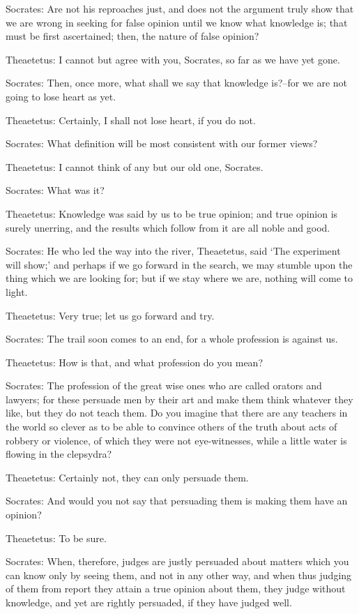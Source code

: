 Socrates: Are not his reproaches just, and does not the argument truly
show that we are wrong in seeking for false opinion until we know what
knowledge is; that must be first ascertained; then, the nature of false
opinion?

Theaetetus: I cannot but agree with you, Socrates, so far as we have yet
gone.

Socrates: Then, once more, what shall we say that knowledge is?--for we
are not going to lose heart as yet.

Theaetetus: Certainly, I shall not lose heart, if you do not.

Socrates: What definition will be most consistent with our former views?

Theaetetus: I cannot think of any but our old one, Socrates.

Socrates: What was it?

Theaetetus: Knowledge was said by us to be true opinion; and true
opinion is surely unerring, and the results which follow from it are all
noble and good.

Socrates: He who led the way into the river, Theaetetus, said `The
experiment will show;' and perhaps if we go forward in the search, we
may stumble upon the thing which we are looking for; but if we stay
where we are, nothing will come to light.

Theaetetus: Very true; let us go forward and try.

Socrates: The trail soon comes to an end, for a whole profession is
against us.

Theaetetus: How is that, and what profession do you mean?

Socrates: The profession of the great wise ones who are called orators
and lawyers; for these persuade men by their art and make them think
whatever they like, but they do not teach them. Do you imagine that
there are any teachers in the world so clever as to be able to convince
others of the truth about acts of robbery or violence, of which
they were not eye-witnesses, while a little water is flowing in the
clepsydra?

Theaetetus: Certainly not, they can only persuade them.

Socrates: And would you not say that persuading them is making them have
an opinion?

Theaetetus: To be sure.

Socrates: When, therefore, judges are justly persuaded about matters
which you can know only by seeing them, and not in any other way, and
when thus judging of them from report they attain a true opinion about
them, they judge without knowledge, and yet are rightly persuaded, if
they have judged well.

